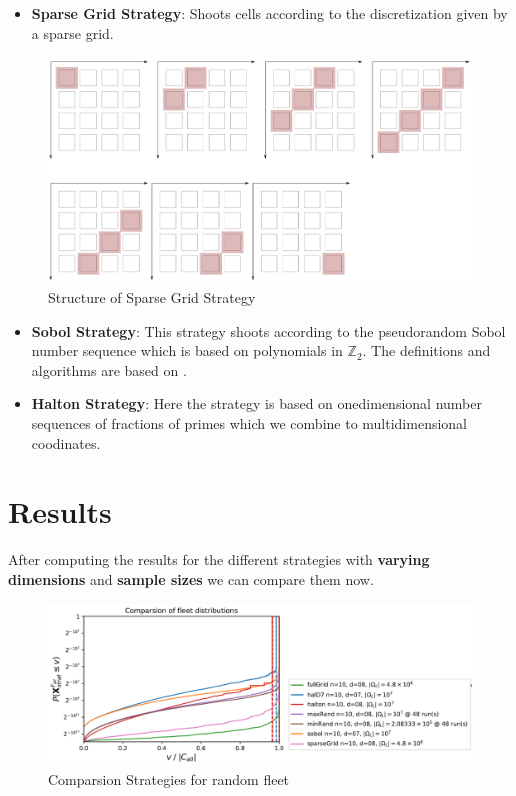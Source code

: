 \documentclass[final,hyperref={pdfpagelabels=false},table]{beamer}
\begin{document}
\begin{frame}
\begin{columns}[T]
\begin{column}{\colCWidth}
\justifying
\begin{itemize}
	\item \textbf{Sparse Grid Strategy}: Shoots cells according to the discretization given by a sparse grid.
\end{itemize}
\begin{figure}[h]
	\centering
	\includegraphics[width=\textwidth]{../gfx/Grids05.png}
	\caption{Structure of Sparse Grid Strategy}
\end{figure}
\begin{itemize}
	\item \textbf{Sobol Strategy}: This strategy shoots according to the pseudorandom Sobol number sequence which is based on polynomials in $\mathbb{Z}_2$. The definitions and algorithms are based on \cite{JK}.
	\item \textbf{Halton Strategy}: Here the strategy is based on onedimensional number sequences of fractions of primes which we combine to multidimensional coodinates.
\end{itemize}

\section{Results}

After computing the results for the different strategies with \textbf{varying dimensions} and \textbf{sample sizes} we can compare them now. 

\begin{figure}[h]
	\centering
	\includegraphics[width=\textwidth]{../gfx/Compare01.png}
	\caption{Comparsion Strategies for random fleet}
	\label{fig:comp01}
\end{figure}


\end{column}
\end{columns}
\end{frame}
\end{document}
